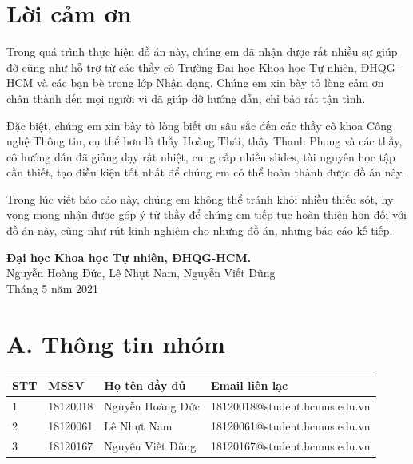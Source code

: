 \documentclass{article}
\newcommand\T{\rule{0pt}{2.6ex}}       %
\newcommand\B{\rule[-1.2ex]{0pt}{0pt}} %
\begin{document}
	\section*{Lời cảm ơn}
	\vspace{1.0in}
	\begingroup
	\setlength{\parindent}{0pt}
	\qquad Trong quá trình thực hiện đồ án này, chúng em đã nhận được rất nhiều sự giúp đỡ cũng như hỗ trợ từ các thầy cô Trường Đại học Khoa học Tự nhiên, ĐHQG-HCM và các bạn bè trong lớp Nhận dạng. Chúng em xin bày tỏ lòng cảm ơn chân thành đến mọi người vì đã giúp đỡ hướng dẫn, chỉ bảo rất tận tình.
	
	Đặc biệt, chúng em xin bày tỏ lòng biết ơn sâu sắc đến các thầy cô khoa Công nghệ Thông tin, cụ thể hơn là thầy Hoàng Thái, thầy Thanh Phong và các thầy, cô hướng dẫn đã giảng dạy rất nhiệt, cung cấp nhiều slides, tài nguyên học tập cần thiết, tạo điều kiện tốt nhất để chúng em có thể hoàn thành được đồ án này.
	
	Trong lúc viết báo cáo này, chúng em không thể tránh khỏi nhiều thiếu sót, hy vọng mong nhận được góp ý từ thầy để chúng em tiếp tục hoàn thiện hơn đối với đồ án này, cũng như rút kinh nghiệm cho những đồ án, những báo cáo kế tiếp.
	
	\vspace{1.0in}
	\textbf{Đại học Khoa học Tự nhiên, ĐHQG-HCM.}\\
	Nguyễn Hoàng Đức, Lê Nhựt Nam, Nguyễn Viết Dũng\\
	Tháng 5 năm 2021\\
	\endgroup
	\newpage
	\tableofcontents
	\newpage
	\setcounter{secnumdepth}{0}
	
	\section{A. Thông tin nhóm}
	\begin{table}[H]
		\begin{tabular}{ | p{1cm} |  p{3cm} | p{5cm} | p{5cm}  |}\hline
			STT	& MSSV & Họ tên đầy đủ & Email liên lạc \T\B\\\hline
			1	& 18120018 & Nguyễn Hoàng Đức &  18120018@student.hcmus.edu.vn\T\B\\\hline
			2	& 18120061 & Lê Nhựt Nam &  18120061@student.hcmus.edu.vn\T\B\\\hline
			3	& 18120167 & Nguyễn Viết Dũng & 18120167@student.hcmus.edu.vn\T\B\\ \hline
		\end{tabular}
	\end{table}		
\end{document}
